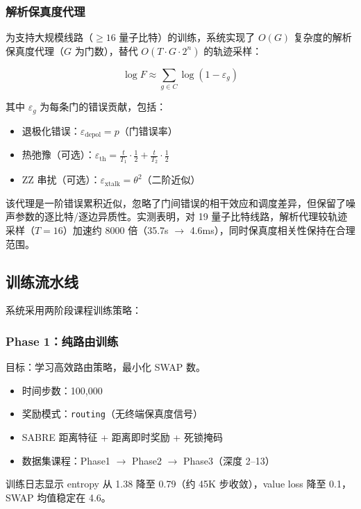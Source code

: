 \subsubsection{解析保真度代理}

为支持大规模线路（$\geq 16$ 量子比特）的训练，系统实现了 $O(G)$ 复杂度的解析保真度代理（$G$ 为门数），替代 $O(T \cdot G \cdot 2^n)$ 的轨迹采样：

\begin{equation}
\log F \approx \sum_{g \in C} \log(1 - \varepsilon_g)
\end{equation}

其中 $\varepsilon_g$ 为每条门的错误贡献，包括：
\begin{itemize}
  \item 退极化错误：$\varepsilon_{\text{depol}} = p$（门错误率）
  \item 热弛豫（可选）：$\varepsilon_{\text{th}} = \frac{t}{T_1} \cdot \frac{1}{2} + \frac{t}{T_2} \cdot \frac{1}{2}$
  \item ZZ 串扰（可选）：$\varepsilon_{\text{xtalk}} = \theta^2$（二阶近似）
\end{itemize}

该代理是一阶错误累积近似，忽略了门间错误的相干效应和调度差异，但保留了噪声参数的逐比特/逐边异质性。实测表明，对 19 量子比特线路，解析代理较轨迹采样（$T=16$）加速约 8000 倍（35.7s $\to$ 4.6ms），同时保真度相关性保持在合理范围。

\subsection{训练流水线}

系统采用两阶段课程训练策略：

\subsubsection{Phase 1：纯路由训练}

目标：学习高效路由策略，最小化 SWAP 数。
\begin{itemize}
  \item 时间步数：100,000
  \item 奖励模式：\texttt{routing}（无终端保真度信号）
  \item SABRE 距离特征 + 距离即时奖励 + 死锁掩码
  \item 数据集课程：Phase1 $\to$ Phase2 $\to$ Phase3（深度 2--13）
\end{itemize}

训练日志显示 entropy 从 1.38 降至 0.79（约 45K 步收敛），value loss 降至 0.1，SWAP 均值稳定在 4.6。

